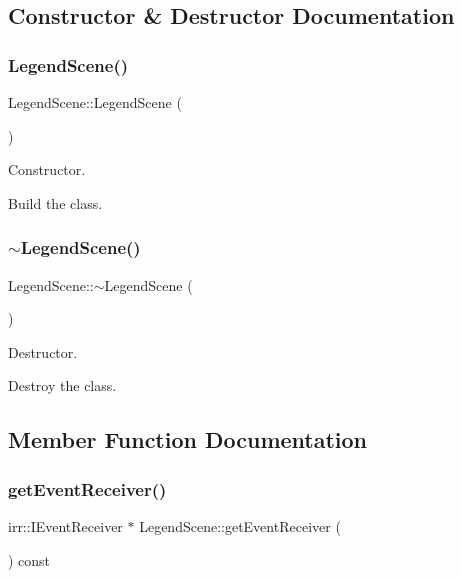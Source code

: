 \subsection{Constructor \& Destructor Documentation}
\mbox{\label{classLegendScene_a33a4d96e0e320724e60d565dec448e38}} 
\subsubsection{\texorpdfstring{Legend\+Scene()}{LegendScene()}}
{\footnotesize\ttfamily Legend\+Scene\+::\+Legend\+Scene (\begin{DoxyParamCaption}{ }\end{DoxyParamCaption})}



Constructor. 

Build the class. \mbox{\label{classLegendScene_a88e66f9964236616735c7b9873641141}} 
\subsubsection{\texorpdfstring{$\sim$\+Legend\+Scene()}{~LegendScene()}}
{\footnotesize\ttfamily Legend\+Scene\+::$\sim$\+Legend\+Scene (\begin{DoxyParamCaption}{ }\end{DoxyParamCaption})}



Destructor. 

Destroy the class. 

\subsection{Member Function Documentation}
\mbox{\label{classLegendScene_ab11340ae844c04d704f28e1ef188deae}} 
\subsubsection{\texorpdfstring{get\+Event\+Receiver()}{getEventReceiver()}}
{\footnotesize\ttfamily irr\+::\+I\+Event\+Receiver $\ast$ Legend\+Scene\+::get\+Event\+Receiver (\begin{DoxyParamCaption}{ }\end{DoxyParamCaption}) const\hspace{0.3cm}{\ttfamily [virtual]}}



